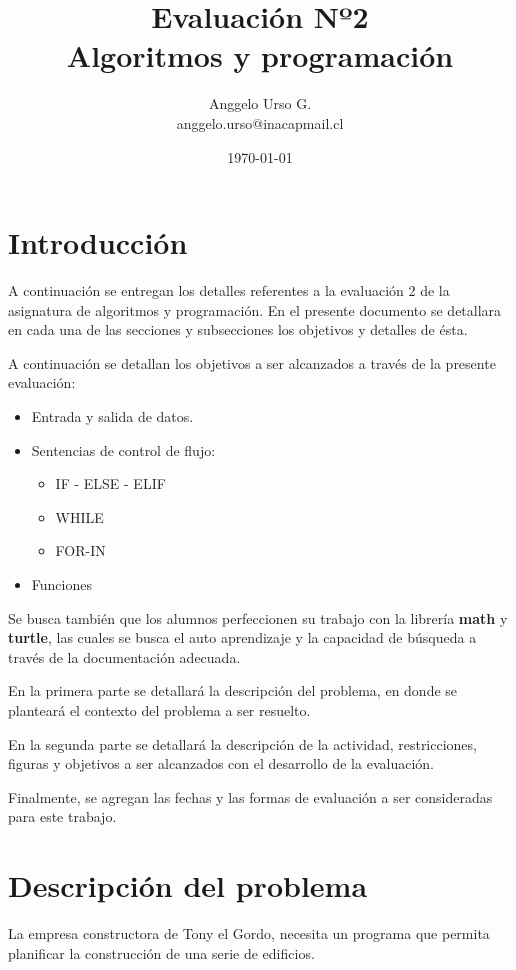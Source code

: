 \documentclass[]{article}
\title{Evaluación Nº2 \protect\\ Algoritmos y programación}
\author{Anggelo Urso G. \\ anggelo.urso@inacapmail.cl}
\date{\today}
\begin{document}
    \thispagestyle{empty}
    \maketitle

    \section{Introducción}
    A continuación se entregan los detalles referentes a la evaluación 2 de la asignatura de algoritmos y programación. En el presente documento se detallara en cada una de las secciones y subsecciones los objetivos y detalles de ésta.

    A continuación se detallan los objetivos a ser alcanzados a través de la presente evaluación:

    \begin{itemize}
        \item Entrada y salida de datos.
        \item Sentencias de control de flujo:
        \begin{itemize}
            \item IF - ELSE - ELIF
            \item WHILE
            \item FOR-IN
        \end{itemize}
        \item Funciones
    \end{itemize}

    Se busca también que los alumnos perfeccionen su trabajo con la librería \textbf{math} y \textbf{turtle}, las cuales se busca el auto aprendizaje y la capacidad de búsqueda a través de la documentación adecuada.

    En la primera parte se detallará la descripción del problema, en donde se planteará el contexto del problema a ser resuelto. 

    En la segunda parte se detallará la descripción de la actividad, restricciones, figuras y objetivos a ser alcanzados con el desarrollo de la evaluación.

    Finalmente, se agregan las fechas y las formas de evaluación a ser consideradas para este trabajo.

    \section{Descripción del problema}
    La empresa constructora de Tony el Gordo, necesita un programa que permita planificar la construcción de una serie de edificios. 
\end{document}
